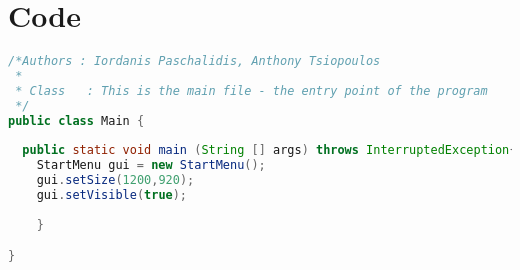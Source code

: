 \section{Code}

\begin{lstlisting}[language=java]
/*Authors : Iordanis Paschalidis, Anthony Tsiopoulos
 * 
 * Class   : This is the main file - the entry point of the program
 */
public class Main {
   
  public static void main (String [] args) throws InterruptedException{
    StartMenu gui = new StartMenu(); 
    gui.setSize(1200,920);
    gui.setVisible(true);
    
    }

}
\end{lstlisting}

\newpage 

